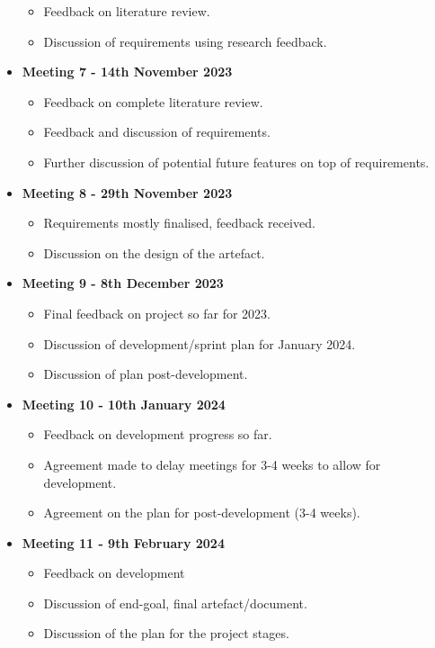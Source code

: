 \begin{itemize}
\begin{itemize}
        \item Feedback on literature review.
        \item Discussion of requirements using research feedback.
    \end{itemize}
    \item \textbf{Meeting 7 - 14th November 2023}
    \begin{itemize}
        \item Feedback on complete literature review.
        \item Feedback and discussion of requirements.
        \item Further discussion of potential future features on top of requirements.
    \end{itemize}
    \item \textbf{Meeting 8 - 29th November 2023}
    \begin{itemize}
        \item Requirements mostly finalised, feedback received.
        \item Discussion on the design of the artefact.
    \end{itemize}
    \item \textbf{Meeting 9 - 8th December 2023}
    \begin{itemize}
        \item Final feedback on project so far for 2023.
        \item Discussion of development/sprint plan for January 2024.
        \item Discussion of plan post-development.
    \end{itemize}
    \item \textbf{Meeting 10 - 10th January 2024}
    \begin{itemize}
        \item Feedback on development progress so far.
        \item Agreement made to delay meetings for 3-4 weeks to allow for development.
        \item Agreement on the plan for post-development (3-4 weeks).
    \end{itemize}
    \item \textbf{Meeting 11 - 9th February 2024}
    \begin{itemize}
        \item Feedback on development
        \item Discussion of end-goal, final artefact/document.
        \item Discussion of the plan for the project stages.

\end{itemize}
\end{itemize}
